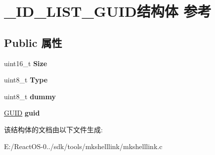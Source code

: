 \hypertarget{struct___i_d___l_i_s_t___g_u_i_d}{}\section{\+\_\+\+I\+D\+\_\+\+L\+I\+S\+T\+\_\+\+G\+U\+I\+D结构体 参考}
\label{struct___i_d___l_i_s_t___g_u_i_d}
\subsection*{Public 属性}
\begin{DoxyCompactItemize}
\item 
\mbox{\label{struct___i_d___l_i_s_t___g_u_i_d_aad0b3afe184201acddb2ab9e4ffc0274}} 
uint16\+\_\+t {\bfseries Size}
\item 
\mbox{\label{struct___i_d___l_i_s_t___g_u_i_d_a23b525581b215495ab58c66bfdd4cea3}} 
uint8\+\_\+t {\bfseries Type}
\item 
\mbox{\label{struct___i_d___l_i_s_t___g_u_i_d_a48e14ad55e3c76763c7c9a8290f90c16}} 
uint8\+\_\+t {\bfseries dummy}
\item 
\mbox{\label{struct___i_d___l_i_s_t___g_u_i_d_a513f10c1b7a7851f3ad01ade844ecb9f}} 
\hyperlink{interface_g_u_i_d}{G\+U\+ID} {\bfseries guid}
\end{DoxyCompactItemize}


该结构体的文档由以下文件生成\+:\begin{DoxyCompactItemize}
\item 
E\+:/\+React\+O\+S-\/0../sdk/tools/mkshelllink/mkshelllink.\+c\end{DoxyCompactItemize}
